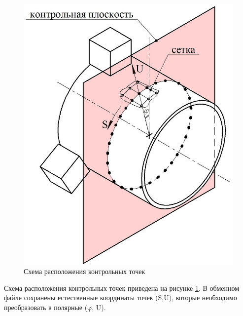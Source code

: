 \documentclass[14pt,oneside,final]{extreport}
\begin{document}
	\begin{figure}[!h]
		\begin{center}
			\includegraphics[scale=1]{img/control-plane} 
		\end{center}
		\caption{Схема расположения контрольных точек}
		\label{fig:control-plane}
	\end{figure}
		
	Схема расположения контрольных точек приведена на рисунке \ref{fig:control-plane}. В обменном файле сохранены естественные координаты точек (S,U), которые необходимо преобразовать в полярные ($ \mathrm{\varphi} $, U).
	
\end{document}
